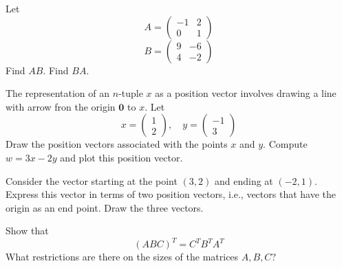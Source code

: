 \documentclass[12pt]{amsbook}
\numberwithin{equation}{section}
\theoremstyle{plain} %
\theoremstyle{definition}
\theoremstyle{remark}
\begin{document}
\bigskip

\begin{Exercise}[title={$AB \ne BA$}, difficulty = 0, label = exmm]
Let
$$A = \left( \begin{array}{rr}
-1 & 2\\
0 & 1 \end{array} \right)$$
$$B = \left( \begin{array}{rr}
9 & -6\\
4 & -2 \end{array} \right)$$
\Question Find $AB$.
\Question Find $BA$.
\end{Exercise}
\bigskip




\begin{Exercise}[title={Position vectors}, difficulty = 0, label = exmm]
The representation of an $n$-tuple $x$ as a position vector involves drawing a line with
arrow fron the origin ${\mathbf{0}}$ to $x$.
Let
$$x = \left( \begin{array}{r}
1 \\
2 \end{array} \right), \quad
y = \left( \begin{array}{r}
-1 \\
3 \end{array} \right)
$$
\Question Draw the position vectors associated with the points $x$ and $y$.
\Question Compute $w = 3x-2y$ and plot this position vector.
\end{Exercise}
\bigskip


\begin{Exercise}[title={Position vectors}, difficulty = 0, label = exmm]
Consider the vector starting at the point $(3,2)$ and ending at $(-2,1)$.
\Question Express this vector in terms of two position vectors, i.e., 
vectors that have the origin as an end point.
\Question Draw the three vectors.
\end{Exercise}

\bigskip
\begin{Exercise}[title={Transpose again}, difficulty = 0, label = 3T]
	Show that
	$$(ABC)^T = C^TB^TA^T$$
	What restrictions are there on the sizes of the matrices $A, B, C$?
	
	
\end{Exercise}
\end{document}
